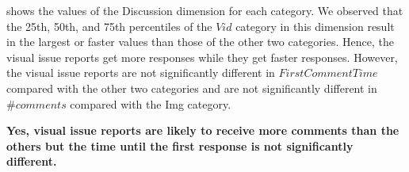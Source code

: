 shows the values of the Discussion dimension
for each category. 
We observed that the 25th, 50th, and 75th percentiles of 
the $Vid$ category in 
this dimension
result in the largest or faster values than those of 
the other two categories.
Hence, the visual issue reports get more responses 
while they get faster responses. 
However, the visual issue reports are not 
significantly different in $FirstCommentTime$ 
compared with the other two categories and 
are not significantly different in $\#comments$ 
compared with the Img category.

\summarybox
{\bf Yes, visual issue reports are likely to receive more comments than the others but the time until the first response is not significantly different. 
}










